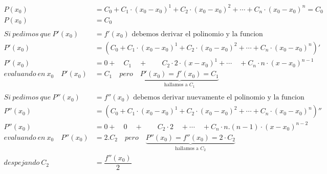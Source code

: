 \begin{equation*}
\begin{split}
 P(x_{0}) &= C_{0} + C_{1} \cdot (x_{0} - x_{0})^{1}+C_{2} \cdot (x_{0} - x_{0})^{2} + \cdots + C_{n} \cdot (x_{0} - x_{0})^{n} = C_{0} \\
 P(x_{0}) &= C_{0} \\ \\
Si \ pedimos \ que \ P'(x_{0}) &= f'(x_{0}) \text{ debemos derivar el polinomio y la funcion} \\
P'(x_{0}) &= ( C_{0} + C_{1} \cdot (x_{0} - x_{0})^{1}+C_{2} \cdot (x_{0} - x_{0})^{2} + \cdots + C_{n} \cdot (x_{0} - x_{0})^{n} )' \\
P'(x_{0}) &= 0 + \quad C_{1} \quad + \quad  \quad  C_{2} \cdot 2 \cdot (x - x_{0})^{1} + \cdots \quad  + C_{n} \cdot n \cdot (x - x_{0})^{n-1} \\
evaluando \ en \ x_{0} \quad P'(x_{0})  &= C_{1} \quad pero \quad \underbrace{ P'(x_{0})  = f'(x_{0}) = C_{1}}_{\text{hallamos a } C_{1}} \\ 
\\
Si \ pedimos \ que \ P''(x_{0}) &= f''(x_{0}) \text{ debemos derivar nuevamente el polinomio y la funcion} \\
P''(x_{0}) &= ( C_{0} + C_{1} \cdot (x_{0} - x_{0})^{1}+C_{2} \cdot (x_{0} - x_{0})^{2} + \cdots + C_{n} \cdot (x_{0} - x_{0})^{n} )'' \\
P''(x_{0}) &= 0 + \quad 0 \quad + \quad  \quad  C_{2} \cdot 2 \quad + \cdots \quad  + C_{n} \cdot n . (n-1) \cdot (x - x_{0})^{n-2} \\
evaluando \ en \ x_{0} \quad P''(x_{0})  &= 2.C_{2} \quad pero \quad \underbrace{ P''(x_{0})  = f''(x_{0}) = 2 \cdot C_{2}}_{\text{hallamos a } C_{2}} \\
despejando \ C_{2} &= \dfrac{f''(x_{0})}{2} \\ \\
\end{split}
\end{equation*}

